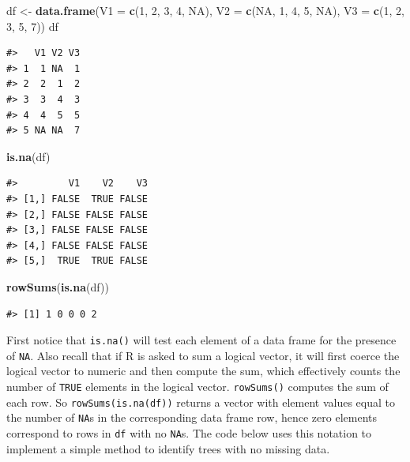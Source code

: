 \documentclass[
  11pt,
]{krantz}
\newenvironment{Shaded}{\begin{snugshade}}{\end{snugshade}}
\newcommand{\DataTypeTok}[1]{\textcolor[rgb]{0.13,0.29,0.53}{#1}}
\newcommand{\DecValTok}[1]{\textcolor[rgb]{0.00,0.00,0.81}{#1}}
\newcommand{\KeywordTok}[1]{\textcolor[rgb]{0.13,0.29,0.53}{\textbf{#1}}}
\newcommand{\NormalTok}[1]{#1}
\newcommand{\OtherTok}[1]{\textcolor[rgb]{0.56,0.35,0.01}{#1}}
\newcommand{\StringTok}[1]{\textcolor[rgb]{0.31,0.60,0.02}{#1}}
\theoremstyle{definition}
\theoremstyle{definition}
\theoremstyle{definition}
\theoremstyle{definition}
\theoremstyle{remark}
\begin{document}
\begin{Shaded}
\begin{Highlighting}[]
\NormalTok{df \textless{}{-}}\StringTok{ }\KeywordTok{data.frame}\NormalTok{(}\DataTypeTok{V1 =} \KeywordTok{c}\NormalTok{(}\DecValTok{1}\NormalTok{, }\DecValTok{2}\NormalTok{, }\DecValTok{3}\NormalTok{, }\DecValTok{4}\NormalTok{, }\OtherTok{NA}\NormalTok{),}
                 \DataTypeTok{V2 =} \KeywordTok{c}\NormalTok{(}\OtherTok{NA}\NormalTok{, }\DecValTok{1}\NormalTok{, }\DecValTok{4}\NormalTok{, }\DecValTok{5}\NormalTok{, }\OtherTok{NA}\NormalTok{),}
                 \DataTypeTok{V3 =} \KeywordTok{c}\NormalTok{(}\DecValTok{1}\NormalTok{, }\DecValTok{2}\NormalTok{, }\DecValTok{3}\NormalTok{, }\DecValTok{5}\NormalTok{, }\DecValTok{7}\NormalTok{))}
\NormalTok{df}
\end{Highlighting}
\end{Shaded}

\begin{verbatim}
#>   V1 V2 V3
#> 1  1 NA  1
#> 2  2  1  2
#> 3  3  4  3
#> 4  4  5  5
#> 5 NA NA  7
\end{verbatim}

\begin{Shaded}
\begin{Highlighting}[]
\KeywordTok{is.na}\NormalTok{(df)}
\end{Highlighting}
\end{Shaded}

\begin{verbatim}
#>         V1    V2    V3
#> [1,] FALSE  TRUE FALSE
#> [2,] FALSE FALSE FALSE
#> [3,] FALSE FALSE FALSE
#> [4,] FALSE FALSE FALSE
#> [5,]  TRUE  TRUE FALSE
\end{verbatim}

\begin{Shaded}
\begin{Highlighting}[]
\KeywordTok{rowSums}\NormalTok{(}\KeywordTok{is.na}\NormalTok{(df))}
\end{Highlighting}
\end{Shaded}

\begin{verbatim}
#> [1] 1 0 0 0 2
\end{verbatim}

First notice that \texttt{is.na()} will test each element of a data frame for the presence of \texttt{NA}. Also recall that if R is asked to sum a logical vector, it will first coerce the logical vector to numeric and then compute the sum, which effectively counts the number of \texttt{TRUE} elements in the logical vector. \texttt{rowSums()} computes the sum of each row. So \texttt{rowSums(is.na(df))} returns a vector with element values equal to the number of \texttt{NA}s in the corresponding data frame row, hence zero elements correspond to rows in \texttt{df} with no \texttt{NA}s. The code below uses this notation to implement a simple method to identify trees with no missing data.
\end{document}
